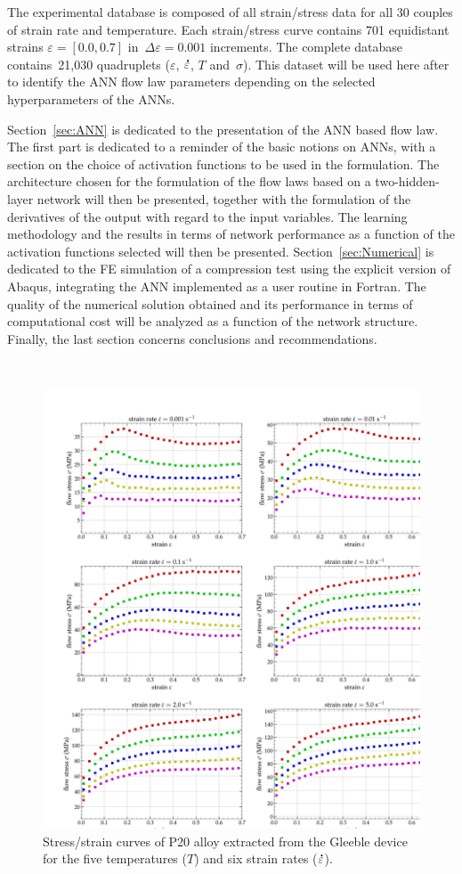 \documentclass[algorithms,article,accept,pdftex,oneauthor]{Definitions/mdpi}
\DeclareRobustCommand{\mdot}[1]{\accentset{\mbox{\bfseries .}}{#1}}
\begin{document}
The experimental database is composed of all strain/stress data for all 30 couples of strain rate and temperature.
Each strain/stress curve contains 701 equidistant strains $\varepsilon=[0.0,0.7]$ in~$\Delta\varepsilon=0.001$ increments.
The complete database contains~21,030 quadruplets ($\varepsilon$, $\mdot{\varepsilon}$, $T$ and~$\sigma$).
This dataset will be used here after to identify the ANN flow law parameters depending on the selected hyperparameters of the ANNs.

Section~\ref{sec:ANN} is dedicated to the presentation of the ANN based flow law.
The first part is dedicated to a reminder of the basic notions on ANNs, with a section on the choice of activation functions to be used in the formulation.
The architecture chosen for the formulation of the flow laws based on a two-hidden-layer network will then be presented, together with the formulation of the derivatives of the output with regard to the input variables.
The learning methodology and the results in terms of network performance as a function of the activation functions selected will then be presented.
Section~\ref{sec:Numerical} is dedicated to the FE simulation of a compression test using the explicit version of Abaqus, integrating the ANN implemented as a user routine in Fortran.
The quality of the numerical solution obtained and its performance in terms of computational cost will be analyzed as a function of the network structure.
Finally, the last section concerns conclusions and recommendations.
\begin{figure}[H]
\

\includegraphics[width=0.9\columnwidth]{Figures/3Cr2Mo-raw}
\caption{Stress/strain curves of P20 alloy extracted from the Gleeble device for the five temperatures ($T$) and six strain rates ($\mdot{\varepsilon}$).}
\label{fig:RawData}
\end{figure}
\end{document}
